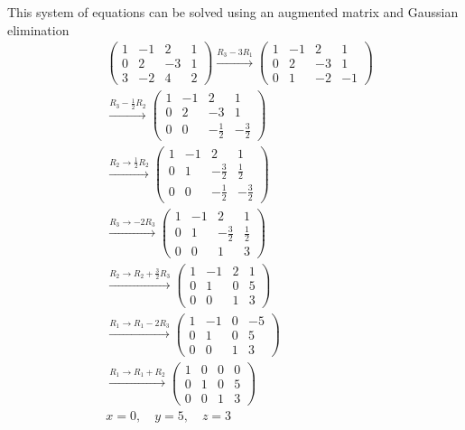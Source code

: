\documentclass[journal]{IEEEtran}
\begin{document}
This system of equations can be solved using an augmented matrix and Gaussian elimination
\begin{align}
&\left(
\begin{array}{ccc|c}
1 & -1 & 2 & 1 \\
0 & 2 & -3 & 1 \\
3 & -2 & 4 & 2
\end{array}
\right)
\xrightarrow{R_3 - 3R_1}
\left(
\begin{array}{ccc|c}
1 & -1 & 2 & 1 \\
0 & 2 & -3 & 1 \\
0 & 1 & -2 & -1
\end{array}
\right) \\
&\xrightarrow{R_3 - \frac{1}{2} R_2}
\left(
\begin{array}{ccc|c}
1 & -1 & 2 & 1 \\
0 & 2 & -3 & 1 \\
0 & 0 & -\frac{1}{2} & -\frac{3}{2}
\end{array}
\right) \\
&\xrightarrow{R_2 \to \frac{1}{2} R_2}
\left(
\begin{array}{ccc|c}
1 & -1 & 2 & 1 \\
0 & 1 & -\frac{3}{2} & \frac{1}{2} \\
0 & 0 & -\frac{1}{2} & -\frac{3}{2}
\end{array}
\right) \\
&\xrightarrow{R_3 \to -2 R_3}
\left(
\begin{array}{ccc|c}
1 & -1 & 2 & 1 \\
0 & 1 & -\frac{3}{2} & \frac{1}{2} \\
0 & 0 & 1 & 3
\end{array}
\right) \\
&\xrightarrow{R_2 \to R_2 + \frac{3}{2} R_3}
\left(
\begin{array}{ccc|c}
1 & -1 & 2 & 1 \\
0 & 1 & 0 & 5 \\
0 & 0 & 1 & 3
\end{array}
\right) \\
&\xrightarrow{R_1 \to R_1 - 2 R_3}
\left(
\begin{array}{ccc|c}
1 & -1 & 0 & -5 \\
0 & 1 & 0 & 5 \\
0 & 0 & 1 & 3
\end{array}
\right) \\
&\xrightarrow{R_1 \to R_1 + R_2}
\left(
\begin{array}{ccc|c}
1 & 0 & 0 & 0 \\
0 & 1 & 0 & 5 \\
0 & 0 & 1 & 3
\end{array}
\right) \\
&x = 0, \quad y = 5, \quad z = 3
\end{align}
\end{document}

